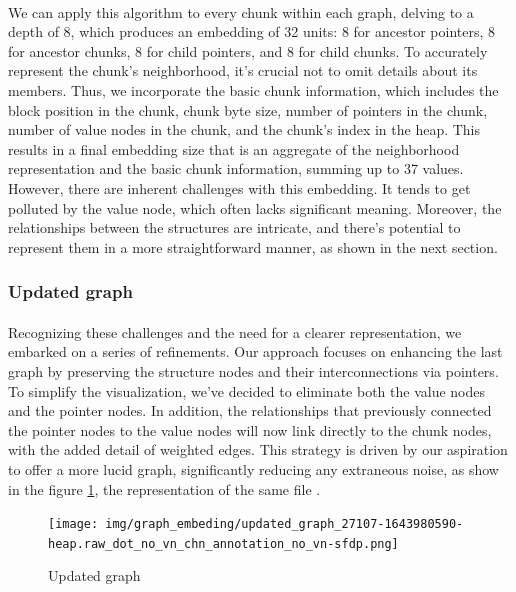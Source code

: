         \paragraph{}We can apply this algorithm to every \gls{chunk} within each graph, delving to a depth of 8, which produces an embedding of 32 units: 8 for ancestor \glspl{pointer}, 8 for ancestor \glspl{chunk}, 8 for child \glspl{pointer}, and 8 for child \glspl{chunk}. To accurately represent the \gls{chunk}'s neighborhood, it's crucial not to omit details about its members. Thus, we incorporate the basic chunk information, which includes the block position in the chunk, chunk byte size, number of pointers in the chunk, number of value nodes in the chunk, and the chunk's index in the heap. This results in a final embedding size that is an aggregate of the neighborhood representation and the basic chunk information, summing up to 37 values. However, there are inherent challenges with this embedding. It tends to get polluted by the value node, which often lacks significant meaning. Moreover, the relationships between the structures are intricate, and there's potential to represent them in a more straightforward manner, as shown in the next section.

    \subsubsection{Updated graph}

        \paragraph{}Recognizing these challenges and the need for a clearer representation, we embarked on a series of refinements. Our approach focuses on enhancing the last graph by preserving the structure nodes and their interconnections via \glspl{pointer}. To simplify the visualization, we've decided to eliminate both the value nodes and the \gls{pointer} nodes. In addition, the relationships that previously connected the \gls{pointer} nodes to the value nodes will now link directly to the \gls{chunk} nodes, with the added detail of weighted edges. This strategy is driven by our aspiration to offer a more lucid graph, significantly reducing any extraneous noise, as show in the figure \ref{fig:graph_embedding:updated_graph}, the representation of the same file .

        \begin{figure}[H]
            \centering
            \texttt{[image: img/graph\_embeding/updated\_graph\_27107-1643980590-heap.raw\_dot\_no\_vn\_chn\_annotation\_no\_vn-sfdp.png]}
            \caption{Updated graph}
            \label{fig:graph_embedding:updated_graph}
        \end{figure}

